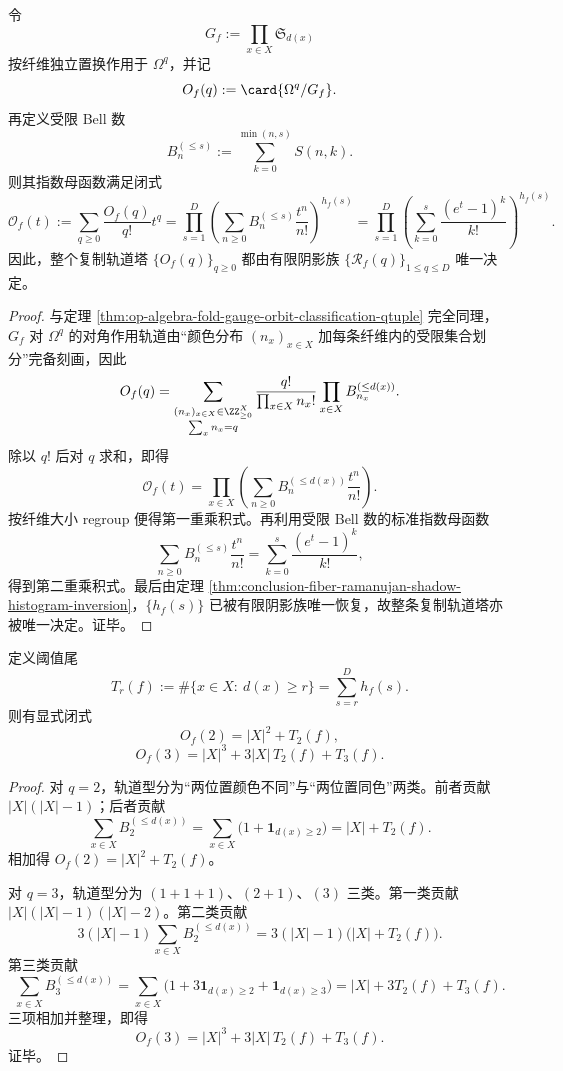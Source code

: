 \begin{theorem}\label{thm:conclusion-fiber-ramanujan-shadow-orbit-egf-completeness}
令
\[
G_f:=\prod_{x\in X}\mathfrak S_{d(x)}
\]
按纤维独立置换作用于 \(\Omega^q\)，并记
\[
O_f(q):=\card{\Omega^q/G_f}.
\]
再定义受限 Bell 数
\[
B_n^{(\le s)}:=\sum_{k=0}^{\min(n,s)}S(n,k).
\]
则其指数母函数满足闭式
\[
\mathcal O_f(t):=\sum_{q\ge 0}\frac{O_f(q)}{q!}t^q
=
\prod_{s=1}^{D}
\left(
\sum_{n\ge 0}B_n^{(\le s)}\frac{t^n}{n!}
\right)^{h_f(s)}
=
\prod_{s=1}^{D}
\left(
\sum_{k=0}^{s}\frac{(e^t-1)^k}{k!}
\right)^{h_f(s)}.
\]
因此，整个复制轨道塔 \(\{O_f(q)\}_{q\ge 0}\) 都由有限阴影族 \(\{\mathscr R_f(q)\}_{1\le q\le D}\) 唯一决定。
\end{theorem}
\begin{proof}
与定理 \ref{thm:op-algebra-fold-gauge-orbit-classification-qtuple} 完全同理，\(G_f\) 对 \(\Omega^q\) 的对角作用轨道由“颜色分布 \((n_x)_{x\in X}\) 加每条纤维内的受限集合划分”完备刻画，因此
\[
O_f(q)
=
\sum_{\substack{(n_x)_{x\in X}\in\ZZ_{\ge 0}^{X}\\ \sum_x n_x=q}}
\frac{q!}{\prod_{x\in X}n_x!}
\prod_{x\in X}B_{n_x}^{(\le d(x))}.
\]
除以 \(q!\) 后对 \(q\) 求和，即得
\[
\mathcal O_f(t)
=
\prod_{x\in X}
\left(
\sum_{n\ge 0}B_n^{(\le d(x))}\frac{t^n}{n!}
\right).
\]
按纤维大小 regroup 便得第一重乘积式。再利用受限 Bell 数的标准指数母函数
\[
\sum_{n\ge 0}B_n^{(\le s)}\frac{t^n}{n!}
=
\sum_{k=0}^{s}\frac{(e^t-1)^k}{k!},
\]
得到第二重乘积式。最后由定理 \ref{thm:conclusion-fiber-ramanujan-shadow-histogram-inversion}，\(\{h_f(s)\}\) 已被有限阴影族唯一恢复，故整条复制轨道塔亦被唯一决定。证毕。
\end{proof}

\begin{corollary}[低阶复制轨道的阈值尾完全显影]\label{cor:conclusion-fiber-ramanujan-shadow-low-order-thresholds}
定义阈值尾
\[
T_r(f):=\#\{x\in X:\ d(x)\ge r\}=\sum_{s=r}^{D}h_f(s).
\]
则有显式闭式
\[
O_f(2)=|X|^2+T_2(f),
\]
\[
O_f(3)=|X|^3+3|X|\,T_2(f)+T_3(f).
\]
\end{corollary}
\begin{proof}
对 \(q=2\)，轨道型分为“两位置颜色不同”与“两位置同色”两类。前者贡献 \(|X|(|X|-1)\)；后者贡献
\[
\sum_{x\in X}B_2^{(\le d(x))}
=
\sum_{x\in X}\bigl(1+\mathbf 1_{d(x)\ge 2}\bigr)
=
|X|+T_2(f).
\]
相加得 \(O_f(2)=|X|^2+T_2(f)\)。

对 \(q=3\)，轨道型分为 \((1+1+1)\)、\((2+1)\)、\((3)\) 三类。第一类贡献 \(|X|(|X|-1)(|X|-2)\)。第二类贡献
\[
3(|X|-1)\sum_{x\in X}B_2^{(\le d(x))}
=
3(|X|-1)\bigl(|X|+T_2(f)\bigr).
\]
第三类贡献
\[
\sum_{x\in X}B_3^{(\le d(x))}
=
\sum_{x\in X}\bigl(1+3\mathbf 1_{d(x)\ge 2}+\mathbf 1_{d(x)\ge 3}\bigr)
=
|X|+3T_2(f)+T_3(f).
\]
三项相加并整理，即得
\[
O_f(3)=|X|^3+3|X|\,T_2(f)+T_3(f).
\]
证毕。
\end{proof}

